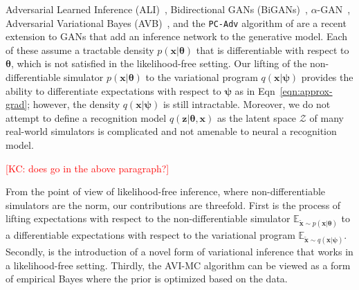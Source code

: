 \documentclass[twocolumn,superscriptaddress,aps]{revtex4-1}
\newcommand{\kcnote}[1]{\textcolor{red}{[KC: #1]}}
\newcommand{\bftheta}{{\bm \theta}}
\newcommand{\bfpsi}{{\bm \psi}}
\newcommand{\bfphi}{{\bm \phi}}
\newcommand{\bfx}{\mathbf{x}}
\newcommand{\bfz}{\mathbf{z}}
\theoremstyle{plain}
\begin{document}
Adversarial Learned Inference (ALI)~\citep{dumoulin2016adversarially},
Bidirectional GANs (BiGANs)~\citep{donahue2016adversarial},
$\alpha$-GAN~\citep{rosca2017variational}, Adversarial Variational Bayes
(AVB)~\citep{DBLP:journals/corr/MeschederNG17}, and the \texttt{PC-Adv}
algorithm of  \citep{2017arXiv170208235H}  are a recent extension to GANs that
add an inference network to the generative model.  Each of these assume a
tractable density $p(\bfx|\bftheta)$ that is differentiable with respect to
$\bftheta$, which is  not satisfied in the likelihood-free setting. Our lifting
of the non-differentiable simulator $p(\bfx|\bftheta)$ to the variational
program $q(\bfx | \bfpsi)$ provides the ability to differentiate expectations
with respect to $\bfpsi$ as in Eqn~\ref{eqn:approx-grad}; however, the density
$q(\bfx | \bfpsi)$ is still intractable. Moreover, we do not attempt to define a
recognition model $q(\bfz | \bftheta, \bfx)$ as the latent space $\mathcal{Z}$
of many real-world simulators is complicated and not amenable to neural a
recognition model.

\kcnote{does \citep{rosca2017variational} go in the above paragraph?}

From the point of view of likelihood-free inference, where  non-differentiable
simulators are the norm, our contributions are threefold. First is the process
of lifting expectations with respect to the non-differentiable simulator
$\mathbb{E}_{\tilde{\bfx} \sim p(\bfx | \bftheta)}$ to a differentiable
expectations with respect to the variational program $\mathbb{E}_{\tilde{\bfx}
\sim q(\bfx | \bfpsi)}$. Secondly, is the introduction of a novel form of
variational inference that works in a likelihood-free setting. Thirdly, the
AVI-MC algorithm can be viewed as a form of empirical Bayes where the prior is
optimized based on the data.

\end{document}
